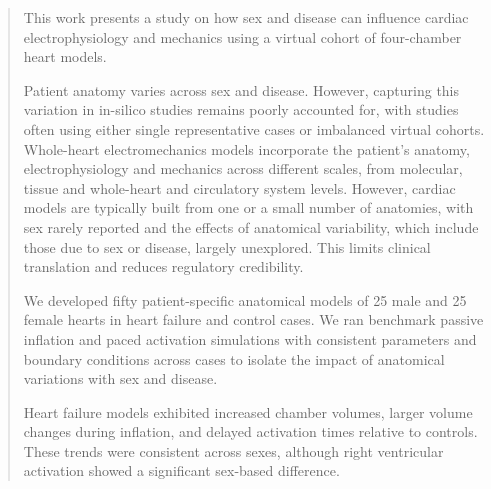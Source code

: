 \documentclass{article}
\begin{document}
\begin{abstract} 
    This work presents a study on how  sex and disease can influence cardiac 
    electrophysiology and mechanics using a virtual cohort of four-chamber 
    heart models.

    Patient anatomy varies across sex and disease. 
    However, capturing this variation in in-silico studies remains poorly accounted for,
    with studies often using either single representative cases or imbalanced virtual cohorts.
    Whole-heart electromechanics models incorporate the patient's anatomy, 
    electrophysiology and mechanics across different scales, from molecular, 
    tissue and whole-heart and circulatory system levels. 
    However, cardiac models are typically built from one or a small number of anatomies, 
    with sex rarely reported and the effects of anatomical variability, which include those due to 
    sex or disease, largely unexplored. 
    This limits clinical translation and reduces regulatory credibility.

    We developed fifty patient-specific anatomical models of 25 male and 25 female hearts in 
    heart failure and control cases.
    We ran benchmark passive inflation and paced activation simulations with consistent parameters and 
    boundary conditions across cases to isolate the impact of anatomical variations with sex and disease.

    Heart failure models exhibited increased chamber volumes, larger volume changes during inflation, 
    and delayed activation times relative to controls. 
    These trends were consistent across sexes, although right ventricular activation showed a significant 
    sex-based difference. 


\end{abstract}
\end{document}
